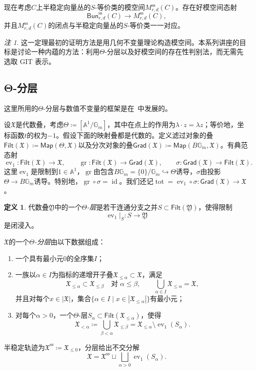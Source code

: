 \documentclass{amsart}
\theoremstyle{definition}
\newtheorem{defn}[thm]{定义}
\theoremstyle{remark}
\newtheorem{rmk}[thm]{注}
\theoremstyle{plain}
\theoremstyle{definition}
\theoremstyle{remark}
\newcommand{\A}{\mathbb{A}}
\newcommand{\G}{\mathbb{G}}
\newcommand{\mf}[1]{\mathfrak{#1}}
\newcommand{\mr}[1]{\mathrm{#1}}
\newcommand{\on}[1]{\operatorname{#1}}
\newcommand{\ms}[1]{\mathsf{#1}}
\newcommand{\1}{\mathbf{1}}
\newcommand{\2}{\mathbf{2}}
\newcommand{\3}{\mathbf{3}}
\DeclareMathOperator{\ev}{ev}
\begin{document}
现在考虑\(C\)上半稳定向量丛的\(S\)-等价类的模空间\(M_{r,d}^{\mr{ss}}(C)\)。存在好模空间态射
\[
    \ms{Bun}_{r,d}^{\mr{ss}}(C)\longrightarrow M_{r,d}^{\mr{ss}}(C),
\]
并且\(M_{r,d}^{\mr{ss}}(C)\)的闭点与半稳定向量丛的\(S\)-等价类一一对应。

\begin{rmk}
    这一定理最初的证明方法是用几何不变量理论构造模空间。本系列讲座的目标是讨论一种内蕴的方法：利用\(\Theta\)-分层以及好模空间的存在性判别法，而无需先选取 GIT 表示。
\end{rmk}


\subsection{Θ-分层}%
\label{sub:Theta-stratifications}

这里所用的\(\Theta\)-分层与数值不变量的框架是在~\cite{HLinstability}中发展的。

设\(\mf{X}\)是代数叠，考虑\(\Theta\coloneqq[\A^1/\G_m]\)，其中在点上的作用为\(\lambda\cdot z=\lambda z\)；等价地，坐标函数\(t\)的权为\(-1\)。假设下面的映射叠都是代数的。定义滤过对象的叠\(\ms{Filt}(\mf{X})\coloneqq\ms{Map}(\Theta,\mf{X})\)以及分次对象的叠\(\ms{Grad}(\mf{X})\coloneqq\ms{Map}(B\G_m,\mf{X})\)。有典范态射
\[
    \ev_1\colon\ms{Filt}(\mf{X})\to\mf{X},
    \qquad
    \on{gr}\colon\ms{Filt}(\mf{X})\to\ms{Grad}(\mf{X}),
    \qquad
    \sigma\colon\ms{Grad}(\mf{X})\to\ms{Filt}(\mf{X}).
\]
这里\(\ev_1\)是限制到\(1\in\A^1\)，\(\on{gr}\)由包含\(B\G_m=\{0\}/\G_m\hookrightarrow\Theta\)诱导，\(\sigma\)由投影\(\Theta\to B\G_m\)诱导。特别地，\(\on{gr}\circ\sigma=\on{id}\)。我们还记\(\on{tot}=\ev_1\circ\sigma\colon\ms{Grad}(\mf{X})\to\mf{X}\)。

\begin{defn}
    代数叠\(\mf{Y}\)中的一个\textit{\(\Theta\)-层}是若干连通分支之并\(S\subset\ms{Filt}(\mf{Y})\)，使得限制
    \[
        \ev_1|_S\colon S\longrightarrow\mf{Y}
    \]
    是闭浸入。

    \(\mf{X}\)的一个\textit{\(\Theta\)-分层}由以下数据组成：
    \begin{enumerate}
        \item 一个具有最小元\(0\)的全序集\(I\)；
        \item 一族以\(\alpha\in I\)为指标的递增开子叠\(\mf{X}_{\leq\alpha}\subset\mf{X}\)，满足
        \[
            \mf{X}_{\leq\alpha}\subset\mf{X}_{\leq\beta}
            \quad\text{对 }\alpha\leq\beta,
            \qquad
            \bigcup_{\alpha\in I}\mf{X}_{\leq\alpha}=\mf{X},
        \]
        并且对每个\(x\in|\mf{X}|\)，集合\(\{\alpha\in I\mid x\in|\mf{X}_{\leq\alpha}|\}\)有最小元；
        \item 对每个\(\alpha>0\)，一个\(\Theta\)-层\(S_\alpha\subset\ms{Filt}(\mf{X}_{\leq\alpha})\)，使得
        \[
            \mf{X}_{<\alpha}
            \coloneqq
            \bigcup_{\beta<\alpha}\mf{X}_{\leq\beta}
            =
            \mf{X}_{\leq\alpha}\setminus\ev_1(S_\alpha).
        \]
    \end{enumerate}
    半稳定轨迹为\(\mf{X}^{\mr{ss}}\coloneqq\mf{X}_{\leq0}\)，分层给出不交分解
    \[
        \mf{X}
        =
        \mf{X}^{\mr{ss}}
        \sqcup
        \bigsqcup_{\alpha>0}\ev_1(S_\alpha).
    \]
\end{defn}
\end{document}
